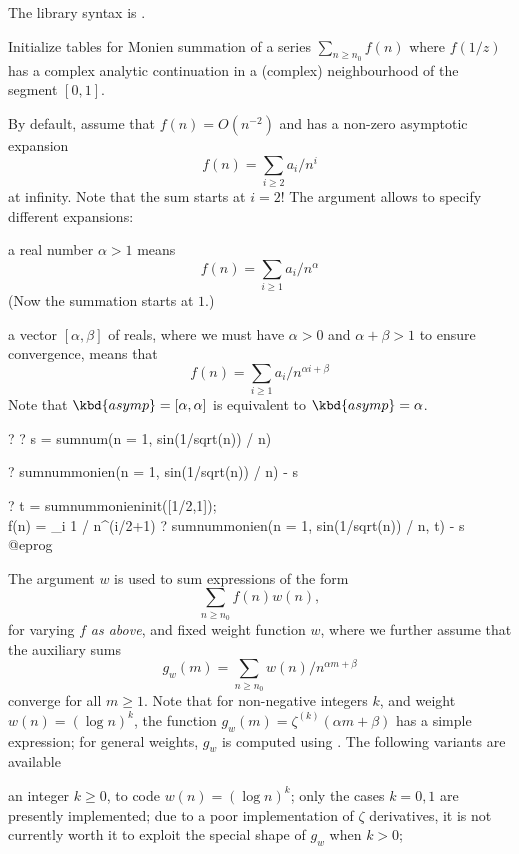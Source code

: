 The library syntax is .

\label{se:sumnummonieninit}
Initialize tables for Monien summation of a series $\sum_{n\geq n_0}
f(n)$ where $f(1/z)$ has a complex analytic continuation in a (complex)
neighbourhood of the segment $[0,1]$.

By default, assume that $f(n) = O(n^{-2})$ and has a non-zero asymptotic
expansion
$$f(n) = \sum_{i\geq 2} a_i / n^i$$
at infinity. Note that the sum starts at $i = 2$! The argument 
allows to specify different expansions:

\item a real number $\alpha > 1$ means
 $$f(n) = \sum_{i\geq 1} a_i / n^\alpha$$
(Now the summation starts at $1$.)

\item a vector $[\alpha,\beta]$ of reals, where we must have $\alpha > 0$
and $\alpha + \beta > 1$ to ensure convergence, means that
 $$f(n) = \sum_{i\geq 1} a_i / n^{\alpha i + \beta}$$
Note that $\kbd{asymp} = [\alpha, \alpha]$ is equivalent to
$\kbd{asymp}=\alpha$.

\bprog
? 
? s = sumnum(n = 1, sin(1/sqrt(n)) / n)

? sumnummonien(n = 1, sin(1/sqrt(n)) / n) - s

? t = sumnummonieninit([1/2,1]);  \\ f(n) = \sum_i 1 / n^(i/2+1)
? sumnummonien(n = 1, sin(1/sqrt(n)) / n, t) - s
@eprog

The argument $w$ is used to sum expressions of the form
$$ \sum_{n\geq n_0} f(n) w(n),$$
for varying $f$ \emph{as above}, and fixed weight function $w$, where we
further assume that the auxiliary sums
$$g_w(m) = \sum_{n\geq n_0} w(n) / n^{\alpha m + \beta} $$
converge for all $m\geq 1$. Note that for non-negative integers $k$,
and weight $w(n) = (\log n)^k$, the function $g_w(m) = \zeta^{(k)}(\alpha m +
\beta)$ has a simple expression; for general weights, $g_w$ is
computed using . The following variants are available

\item an integer $k \geq 0$, to code $w(n) = (\log n)^k$;
only the cases $k = 0,1$ are presently implemented; due to a poor
implementation of $\zeta$ derivatives, it is not currently worth it
to exploit the special shape of $g_w$ when $k > 0$;

